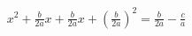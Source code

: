 \documentclass[preview]{standalone}
\begin{document}
\begin{align*}
{x}^{2} + \frac{b}{2 a} x + \frac{b}{2 a} x + {\left( \frac{b}{2 a} \right)}^{2} = \frac{b}{2 a} - \frac{c}{a}
\end{align*}
\end{document}
